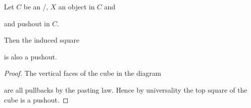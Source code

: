 \begin{lemma}\label{lem:productPreservesPushout}
    Let $C$ be an \inftytop/, $X$ an object in $C$ and
    \begin{center}
    \end{center} 
    and pushout in $C$.

    Then the induced square
    \begin{center}
    \end{center} 
    is also a pushout.
    \begin{proof}
        The vertical faces of the cube in the diagram
        \begin{center}
        \end{center}
        are all pullbacks by the pasting law.
        Hence by universality the top square of the cube is a pushout.
    \end{proof}
\end{lemma}
